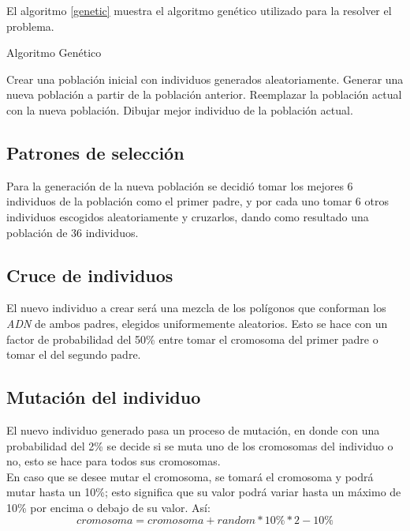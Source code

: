 \documentclass[11pt, spanish]{article}
\begin{document}
El algoritmo \ref{genetic} muestra el algoritmo genético utilizado para la resolver el problema.

\begin{algorithm}
	\caption{Algoritmo Genético}
	\label{genetic}
	\begin{algorithmic}
		\STATE Crear una población inicial con individuos generados aleatoriamente.
			\STATE Generar una nueva población a partir de la población anterior.
			\STATE Reemplazar la población actual con la nueva población.
				\STATE Dibujar mejor individuo de la población actual.
			\ENDIF
		\ENDFOR
	\end{algorithmic}
\end{algorithm}

\subsection{Patrones de selección}
Para la generación de la nueva población se decidió tomar los mejores 6 individuos de la población como el primer padre, y por cada uno tomar 6 otros individuos escogidos aleatoriamente y cruzarlos, dando como resultado una población de 36 individuos.

\subsection{Cruce de individuos}
El nuevo individuo a crear será una mezcla de los polígonos que conforman los \emph{ADN} de ambos padres, elegidos uniformemente aleatorios. Esto se hace con un factor de probabilidad del 50\% entre tomar el cromosoma del primer padre o tomar el del segundo padre.

\subsection{Mutación del individuo}
El nuevo individuo generado pasa un proceso de mutación, en donde con una probabilidad del 2\% se decide si se muta uno de los cromosomas del individuo o no, esto se hace para todos sus cromosomas. \\

En caso que se desee mutar el cromosoma, se tomará el cromosoma y podrá mutar hasta un 10\%; esto significa que su valor podrá variar hasta un máximo de 10\% por encima o debajo de su valor. Así:
$$ cromosoma = cromosoma + random * 10\% * 2 - 10\% $$
\end{document}
